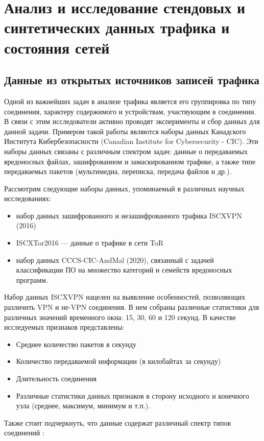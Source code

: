 \chapter{Анализ и исследование стендовых и синтетических данных трафика и состояния сетей}\label{ch:ch2}

\section{Данные из открытых источников записей трафика}\label{sec:ch2/sec1}


Одной из важнейших задач в анализе трафика является его группировка по типу соединения, характеру содержимого и устройствам, участвующим в соединении. В связи с этим исследователи активно проводят эксперименты и сбор данных для данной задачи. Примером такой работы являются наборы данных Канадского Института Кибербезопасности (Canadian Institute for Cybersecurity - CIC). Эти наборы данных связаны с различным спектром задач: данные о передаваемых вредоносных файлах, зашифрованном и замаскированном трафике, а также типе передаваемых пакетов (мультимедиа, переписка, передача файлов и др.).

Рассмотрим следующие наборы данных, упоминаемый в различных  научных исследованиях:

\begin{itemize}
	\item набор данных зашифрованного и незашифрованного трафика ISCXVPN (2016) \cite{icissp16}
	
	\item ISCXTor2016 — данные о трафике в сети ToR \cite{tornontor}
	
	\item набор данных CCCS-CIC-AndMal (2020), связанный с задачей классификации ПО на множество категорий и семейств вредоносных программ. \cite{Rahali2021}
	
\end{itemize}


Набор данных ISCXVPN нацелен на выявление особенностей, позволяющих различить VPN и не-VPN соединения.  В нем собраны различные статистики для различных значений временного окна: 15, 30, 60 и 120 секунд. В качестве исследуемых признаков представлены: 
\begin{itemize}
	\item Среднее количество пакетов в секунду
	\item Количество передаваемой информации (в килобайтах за секунду)
	\item Длительность соединения
	\item Различные статистики данных признаков в сторону исходного и конечного узла (среднее, максимум, минимум и т.п.). 
\end{itemize}
Также стоит подчеркнуть, что данные содержат различный спектр типов соединений :

